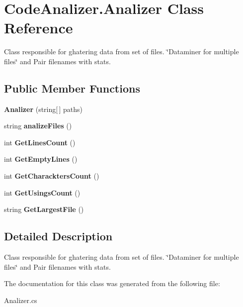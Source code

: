 \hypertarget{class_code_analizer_1_1_analizer}{}\section{Code\+Analizer.\+Analizer Class Reference}
\label{class_code_analizer_1_1_analizer}


Class responsible for ghatering data from set of files. \char`\"{}\+Dataminer for multiple files\char`\"{} and Pair filenames with stats.  


\subsection*{Public Member Functions}
\begin{DoxyCompactItemize}
\item 
\mbox{\label{class_code_analizer_1_1_analizer_ae88a3c45078872c308e2c5604248cf50}} 
{\bfseries Analizer} (string\mbox{[}$\,$\mbox{]} paths)
\item 
\mbox{\label{class_code_analizer_1_1_analizer_acd0ea4f2338b139132ff43ac72bd9cf1}} 
string {\bfseries analize\+Files} ()
\item 
\mbox{\label{class_code_analizer_1_1_analizer_a5b7a9f2c835e8f9b43f3d9810e8dd91e}} 
int {\bfseries Get\+Lines\+Count} ()
\item 
\mbox{\label{class_code_analizer_1_1_analizer_a0a03f7f53bd6e7283a4f91ad0714a922}} 
int {\bfseries Get\+Empty\+Lines} ()
\item 
\mbox{\label{class_code_analizer_1_1_analizer_a97730ca4bd3b1dbe6257779279f0f7f4}} 
int {\bfseries Get\+Charackters\+Count} ()
\item 
\mbox{\label{class_code_analizer_1_1_analizer_a24b3b64b468e6e78c6050d4873e21125}} 
int {\bfseries Get\+Usings\+Count} ()
\item 
\mbox{\label{class_code_analizer_1_1_analizer_a05eb6e6a5592ea98f04b8cd3a146b329}} 
string {\bfseries Get\+Largest\+File} ()
\end{DoxyCompactItemize}


\subsection{Detailed Description}
Class responsible for ghatering data from set of files. \char`\"{}\+Dataminer for multiple files\char`\"{} and Pair filenames with stats. 



The documentation for this class was generated from the following file\+:\begin{DoxyCompactItemize}
\item 
Analizer.\+cs\end{DoxyCompactItemize}
